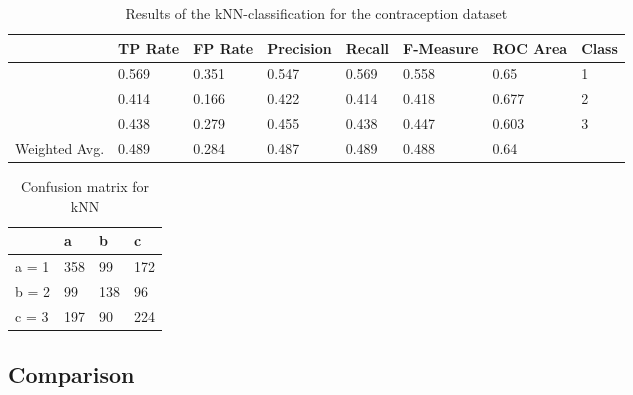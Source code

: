 \documentclass[paper=a4, fontsize=11pt]{scrartcl} %
\numberwithin{equation}{section} %
\numberwithin{figure}{section} %
\numberwithin{table}{section} %
\begin{document}
\begin{table}[h]
\centering
\begin{tabular}{|llllllll|}
	\hline
	&								TP Rate   	&FP Rate   &Precision   &Recall  &F-Measure   &ROC Area  	&Class\\
	\hline
									&0.569     	&0.351     &0.547     	&0.569   &0.558      	&0.65     	&1\\
                 	&0.414     	&0.166     &0.422     	&0.414   &0.418      	&0.677    	&2\\
                 	&0.438     	&0.279     &0.455     	&0.438   &0.447      	&0.603    	&3\\
  \hline
	Weighted Avg.   &0.489     	&0.284     &0.487     	&0.489   &0.488      	&0.64			&\\
	\hline
\end{tabular}
\caption{Results of the kNN-classification for the contraception dataset}
\end{table}

\vspace{6pt}

\begin{table}[h]
\centering
\begin{tabular}{|l|lll|}
	\hline
	      &a   &b   &c \\
	\hline
    a = 1 &358 &99  &172\\
    b = 2 &99  &138 &96 \\
 	c = 3 &197 &90  &224 \\
  \hline
\end{tabular}
\caption{Confusion matrix for kNN}
\end{table}

\subsection{Comparison}


\end{document}
